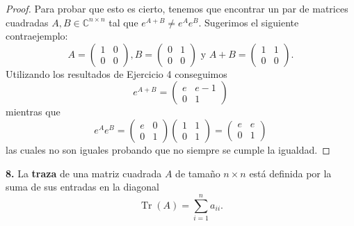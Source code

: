 \documentclass{article}
\newenvironment{statement}[1]{\smallskip\noindent\color[rgb]{1.00,0.00,0.50} {\bf #1.}}{}
\theoremstyle{definition}
\theoremstyle{remark}
\newcommand{\BC}{\mathbb C}
\DeclareMathOperator{\Tr}{Tr}
\begin{document}
\begin{proof}
  Para probar que esto es cierto, tenemos que encontrar un par de matrices
  cuadradas $A, B \in \BC^{n \times n}$ tal que $e^{A + B} \neq e^A e^B$.
  Sugerimos el siguiente contraejemplo:
  \[
    A = \begin{pmatrix}
      1 & 0 \\
      0 & 0
    \end{pmatrix},
    B = \begin{pmatrix}
      0 & 1 \\
      0 & 0
    \end{pmatrix}
    \text{ y }
    A + B = \begin{pmatrix}
      1 & 1 \\
      0 & 0
    \end{pmatrix}.
  \]
  Utilizando los resultados de Ejercicio 4 conseguimos
  \[
    e^{A + B} = \begin{pmatrix}
      e & e - 1 \\
      0 & 1
    \end{pmatrix}  
  \]
  mientras que
  \[
    e^A e^B =
    \begin{pmatrix}
      e & 0 \\
      0 & 1
    \end{pmatrix}
    \begin{pmatrix}
      1 & 1 \\
      0 & 1
    \end{pmatrix}
    =
    \begin{pmatrix}
      e & e \\
      0 & 1
    \end{pmatrix}
  \]
  las cuales no son iguales probando que no siempre se cumple la igualdad.
\end{proof}

\begin{statement}{8}
  La \textbf{traza} de una matriz cuadrada $A$ de tama\~no $n \times n$ est\'a
  definida por la suma de sus entradas en la diagonal
  \[
    \Tr(A) = \sum_{i = 1} ^ n a_{i i}.  
  \]
\end{statement}
\end{document}
